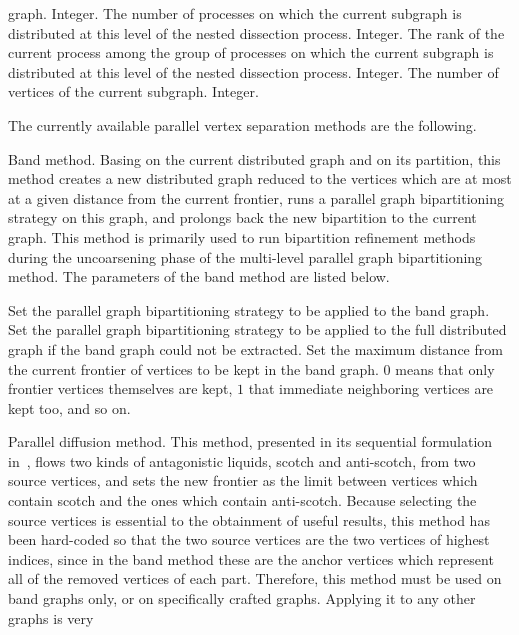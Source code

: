 \begin{itemize}
\begin{itemize}
\begin{itemize}
graph.
Integer.
\iteme[{\tt proc}]
The number of processes on which the current subgraph is distributed
at this level of the nested dissection process.
Integer.
\iteme[{\tt rank}]
The rank of the current process among the group of processes on
which the current subgraph is distributed at this level of the
nested dissection process.
Integer.
\iteme[{\tt vert}]
The number of vertices of the current subgraph.
Integer.
\end{itemize}
\end{itemize}
The currently available parallel vertex separation methods are the
following.
\begin{itemize}
\iteme[{\tt b}]
Band method. Basing on the current distributed graph and on its
partition, this method creates a new distributed graph reduced to the
vertices which are at most at a given distance from the current
frontier, runs a parallel graph bipartitioning strategy on this graph,
and prolongs back the new bipartition to the current graph. This method
is primarily used to run bipartition refinement methods during the
uncoarsening phase of the multi-level parallel graph bipartitioning
method. The parameters of the band method are listed below.
\begin{itemize}
\iteme[{\tt bnd=}{\it strat}]
Set the parallel graph bipartitioning strategy to be applied to the band
graph.
\iteme[{\tt org=}{\it strat}]
Set the parallel graph bipartitioning strategy to be applied to the
full distributed graph if the band graph could not be extracted.
\iteme[{\tt width=}{\it val}]
Set the maximum distance from the current frontier of vertices to be
kept in the band graph. $0$ means that only frontier vertices
themselves are kept, $1$ that immediate neighboring vertices are kept
too, and so on.
\end{itemize}
\iteme[{\tt d}]
Parallel diffusion method. This method, presented in its sequential
formulation in~\cite{pell07b}, flows two kinds of antagonistic
liquids, scotch and anti-scotch, from two source vertices, and sets
the new frontier as the limit between vertices which contain scotch
and the ones which contain anti-scotch. Because selecting the source
vertices is essential to the obtainment of useful results, this method
has been hard-coded so that the two source vertices are the two
vertices of highest indices, since in the band method these are the
anchor vertices which represent all of the removed vertices of each
part. Therefore, this method must be used on band graphs only, or on
specifically crafted graphs. Applying it to any other graphs is very

\end{itemize}
\end{itemize}
